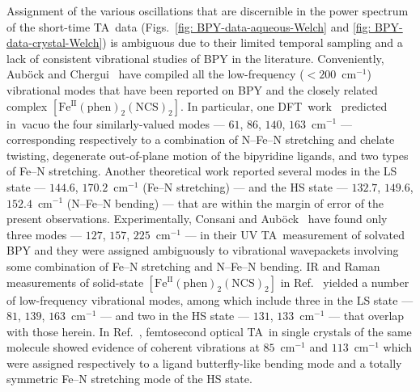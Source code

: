 Assignment of the various oscillations that are discernible
in the power spectrum of the short-time TA~data (Figs.~\ref{fig: BPY-data-aqueous-Welch}
and \ref{fig: BPY-data-crystal-Welch}) is ambiguous due to their limited temporal sampling
and a lack of consistent vibrational studies of BPY in the literature.
%
Conveniently, Aub\"{o}ck and Chergui~\cite{Aubock2015} have compiled
all the low-frequency ($< 200$~cm$^{-1}$) vibrational modes that have been reported
on BPY and the closely related complex $\mathrm{[Fe^{II}(phen)_2(NCS)_2]}$.
%
In particular, one DFT~work~\cite{Alexander2008} predicted in~vacuo
the four similarly-valued modes --- $61$, $86$, $140$, $163$~cm$^{-1}$ ---
corresponding respectively to a combination of N--Fe--N stretching and chelate twisting,
degenerate out-of-plane motion of the bipyridine ligands, and two types of Fe--N stretching.
%
Another theoretical work reported several modes in the LS state ---
$144.6$, $170.2$~cm$^{-1}$ (Fe--N stretching) --- and the HS state ---
$132.7$, $149.6$, $152.4$~cm$^{-1}$ (N--Fe--N bending) ---
that are within the margin of error of the present observations.
%
Experimentally, Consani and Aub\"{o}ck~\cite{Consani2009, Aubock2015}
have found only three modes --- $127$, $157$, $225$~cm$^{-1}$ --- in their UV TA~measurement
of solvated BPY and they were assigned ambiguously to vibrational wavepackets
involving some combination of Fe--N stretching and N--Fe--N bending.
%
IR and Raman measurements of solid-state $\mathrm{[Fe^{II}(phen)_2(NCS)_2]}$
in Ref.~\cite{Ronayne2006} yielded a number of low-frequency vibrational modes,
among which include three in the LS state --- $81$, $139$, $163$~cm$^{-1}$ ---
and two in the HS state --- $131$, $133$~cm$^{-1}$ --- that overlap with those herein.
%
In Ref.~\cite{Cammarata2014}, femtosecond optical TA~in single crystals of the same molecule
showed evidence of coherent vibrations at $85$~cm$^{-1}$ and $113$~cm$^{-1}$
which were assigned respectively to a ligand butterfly-like bending mode
and a totally symmetric Fe--N stretching mode of the HS state.

